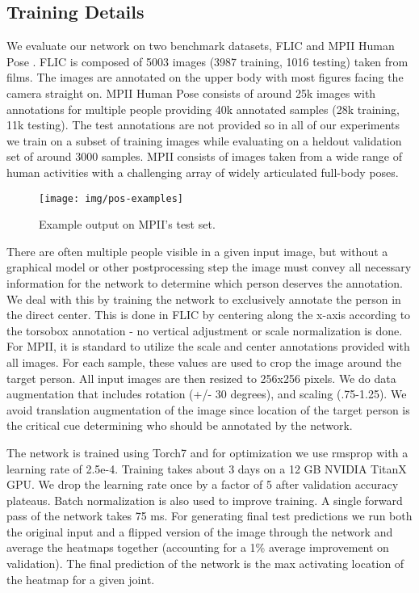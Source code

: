 \documentclass[runningheads]{llncs}
\begin{document}
\subsection{Training Details}

We evaluate our network on two benchmark datasets, FLIC
\cite{sapp2013modec} and MPII Human Pose \cite{andriluka20142d}. FLIC
is composed of 5003 images (3987 training, 1016 testing) taken from
films. The images are annotated on the upper body with most
figures facing the camera straight on. MPII Human Pose consists of
around 25k images with annotations for multiple people providing 40k
annotated samples (28k training, 11k testing). The test annotations
are not provided so in all of our experiments we train on a subset of
training images while evaluating on a heldout validation set of around
3000 samples. MPII consists of images taken from a wide range of human
activities with a challenging array of widely articulated full-body
poses.

\begin{figure}[t]
\centering
\texttt{[image: img/pos-examples]}
\caption{Example output on MPII's test set.}
\label{fig:pos-examples}
\end{figure}

There are often multiple people visible in a given input image, but
without a graphical model or other postprocessing step the image must
convey all necessary information for the network to determine which
person deserves the annotation. We deal with this by training the
network to exclusively annotate the person in the direct center. This
is done in FLIC by centering along the x-axis according to the
torsobox annotation - no vertical adjustment or scale normalization is
done. For MPII, it is standard to utilize the scale and center
annotations provided with all images. For each sample, these values
are used to crop the image around the target person. All input images
are then resized to 256x256 pixels. We do data augmentation that
includes rotation (+/- 30 degrees), and scaling (.75-1.25). We avoid
translation augmentation of the image since location of the target
person is the critical cue determining who should be annotated by the
network.

The network is trained using Torch7 \cite{torch7} and for optimization
we use rmsprop \cite{rmsprop} with a learning rate of 2.5e-4. Training
takes about 3 days on a 12 GB NVIDIA TitanX GPU. We drop the learning
rate once by a factor of 5 after validation accuracy plateaus. Batch
normalization \cite{ioffe2015batch} is also used to improve
training. A single forward pass of the network takes 75 ms. For
generating final test predictions we run both the original input
and a flipped version of the image through the network and average the
heatmaps together (accounting for a 1\% average improvement on
validation). The final prediction of the network is the max
activating location of the heatmap for a given joint.
\end{document}
